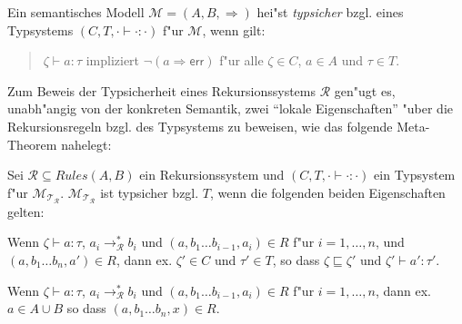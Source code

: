 \documentclass[12pt,a4paper,final]{article}
\begin{document}
\begin{definition}[Typsicherheit]
  Ein semantisches Modell \mbox{$\mathcal{M} = (A,B,\Rightarrow)$} hei"st \emph{typsicher} bzgl.
  eines Typsystems \mbox{$(C,T,\cdot\vdash\cdot:\cdot)$} f"ur $\mathcal{M}$, wenn gilt:
  \begin{quote}
    \mbox{$\zeta \vdash a : \tau$} impliziert \mbox{$\neg(a \Rightarrow \mathsf{err})$}
    f"ur alle \mbox{$\zeta \in C$}, \mbox{$a \in A$} und \mbox{$\tau \in T$}.
  \end{quote}
\end{definition}

Zum Beweis der Typsicherheit eines Rekursionssystems $\mathcal{R}$ gen"ugt es, unabh"angig von
der konkreten Semantik, zwei ``lokale Eigenschaften'' "uber die Rekursionsregeln bzgl. des
Typsystems zu beweisen, wie das folgende Meta-Theorem nahelegt:

\begin{theorem}[Typsicherheit]
  Sei \mbox{$\mathcal{R} \subseteq \mathit{Rules}(A,B)$} ein Rekursionssystem und
  \mbox{$(C,T,\cdot\vdash\cdot:\cdot)$} ein Typsystem f"ur \mbox{$\mathcal{M}_{\mathcal{T}_{\mathcal{R}}}$}.
  \mbox{$\mathcal{M}_{\mathcal{T}_{\mathcal{R}}}$} ist typsicher bzgl. $T$, wenn die folgenden beiden Eigenschaften
  gelten:
  \begin{description}[labelindent=\parindent,style=nextline]
  \item[Local Preservation] 
    Wenn \mbox{$\zeta \vdash a : \tau$},
    \mbox{$a_i \rightarrow_{\mathcal{R}}^* b_i$} und \mbox{$(a,b_1 \ldots b_{i-1},a_i) \in R$} f"ur
    \mbox{$i=1,\ldots,n$}, und \mbox{$(a,b_1 \ldots b_n,a') \in R$}, dann ex. \mbox{$\zeta' \in C$} und
    \mbox{$\tau' \in T$}, so dass \mbox{$\zeta \sqsubseteq \zeta'$} und \mbox{$\zeta' \vdash a' : \tau'$}.
    
  \item[Local Progress]
    Wenn \mbox{$\zeta \vdash a : \tau$},
    \mbox{$a_i \rightarrow_{\mathcal{R}}^* b_i$} und \mbox{$(a,b_1 \ldots b_{i-1},a_i) \in R$} f"ur
    \mbox{$i=1,\ldots,n$}, dann ex. \mbox{$a \in A \cup B$} so dass \mbox{$(a,b_1 \ldots b_n,x) \in R$}.
  \end{description}
\end{theorem}




\end{document}

